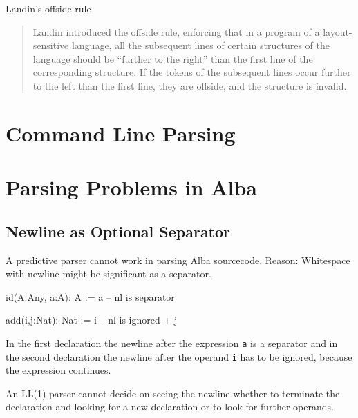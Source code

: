 Landin's offside rule
\begin{quote}
  Landin introduced the offside rule, enforcing that in a program of a layout-
  sensitive language, all the subsequent lines of certain structures of the
  language should be ``further to the right'' than the first line of the
  corresponding structure. If the tokens of the subsequent lines occur further
  to the left than the first line, they are offside, and the structure is
  invalid.
\end{quote}


\section{Command Line Parsing}



\section{Parsing Problems in Alba}

\subsection{Newline as Optional Separator}

A predictive parser cannot work in parsing Alba sourcecode. Reason: Whitespace
with newline might be significant as a separator.

\begin{alba}
  id(A:Any, a:A): A :=
    a        -- nl is separator

  add(i,j:Nat): Nat :=
    i        -- nl is ignored
    + j
\end{alba}
%
In the first declaration the newline after the expression \verb!a! is a
separator and in the second declaration the newline after the operand \verb!i!
has to be ignored, because the expression continues.

An LL(1) parser cannot decide on seeing the newline whether to terminate the
declaration and looking for a new declaration or to look for further operands.

